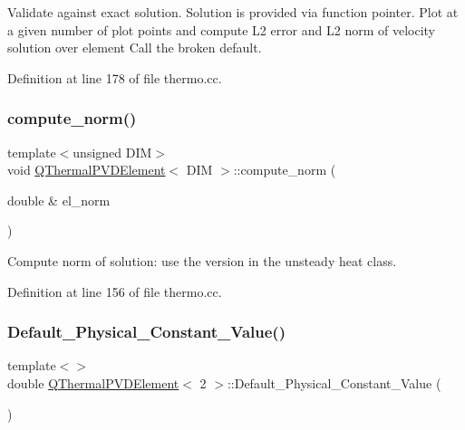 Validate against exact solution. Solution is provided via function pointer. Plot at a given number of plot points and compute L2 error and L2 norm of velocity solution over element Call the broken default. 



Definition at line 178 of file thermo.\+cc.

\mbox{\label{classQThermalPVDElement_a7824ab9fd50480c1eb8b20e57620afe5}} 
\subsubsection{\texorpdfstring{compute\+\_\+norm()}{compute\_norm()}}
{\footnotesize\ttfamily template$<$unsigned D\+IM$>$ \\
void \hyperlink{classQThermalPVDElement}{Q\+Thermal\+P\+V\+D\+Element}$<$ D\+IM $>$\+::compute\+\_\+norm (\begin{DoxyParamCaption}\item[{double \&}]{el\+\_\+norm }\end{DoxyParamCaption})\hspace{0.3cm}{\ttfamily [inline]}}



Compute norm of solution\+: use the version in the unsteady heat class. 



Definition at line 156 of file thermo.\+cc.

\mbox{\label{classQThermalPVDElement_a1c0b33534256a66daf988a8fbb8d8cde}} 
\subsubsection{\texorpdfstring{Default\+\_\+\+Physical\+\_\+\+Constant\+\_\+\+Value()}{Default\_Physical\_Constant\_Value()}}
{\footnotesize\ttfamily template$<$$>$ \\
double \hyperlink{classQThermalPVDElement}{Q\+Thermal\+P\+V\+D\+Element}$<$ 2 $>$\+::Default\+\_\+\+Physical\+\_\+\+Constant\+\_\+\+Value (\begin{DoxyParamCaption}{ }\end{DoxyParamCaption})\hspace{0.3cm}{\ttfamily [private]}}



